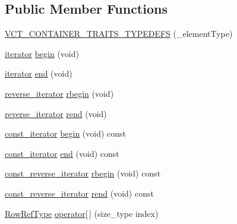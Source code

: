 \subsection*{Public Member Functions}
\begin{DoxyCompactItemize}
\item 
\hyperlink{classvct_dynamic_matrix_base_a9b74344e1642b42867b98720ed1ad438}{V\+C\+T\+\_\+\+C\+O\+N\+T\+A\+I\+N\+E\+R\+\_\+\+T\+R\+A\+I\+T\+S\+\_\+\+T\+Y\+P\+E\+D\+E\+F\+S} (\+\_\+element\+Type)
\item 
\hyperlink{classvct_dynamic_const_matrix_base_aee4b4524b7972fd1b324cba62505a949}{iterator} \hyperlink{classvct_dynamic_matrix_base_a8e125be29ccb28a13af84680926fee6f}{begin} (void)
\item 
\hyperlink{classvct_dynamic_const_matrix_base_aee4b4524b7972fd1b324cba62505a949}{iterator} \hyperlink{classvct_dynamic_matrix_base_ad99c7e972083d4a5377bc2516ce3426b}{end} (void)
\item 
\hyperlink{classvct_dynamic_const_matrix_base_a53905f35527b9ce433c246ab50a6b812}{reverse\+\_\+iterator} \hyperlink{classvct_dynamic_matrix_base_a61a464c0f702516f2f165227afd2c8b0}{rbegin} (void)
\item 
\hyperlink{classvct_dynamic_const_matrix_base_a53905f35527b9ce433c246ab50a6b812}{reverse\+\_\+iterator} \hyperlink{classvct_dynamic_matrix_base_a487009a6380b8016848b1f194f0b17bf}{rend} (void)
\item 
\hyperlink{classvct_dynamic_const_matrix_base_a665b16a8ecd8b6febb4d193efa42205e}{const\+\_\+iterator} \hyperlink{classvct_dynamic_matrix_base_a0e89cf694e8502ca5a1701a27dc4ec87}{begin} (void) const 
\item 
\hyperlink{classvct_dynamic_const_matrix_base_a665b16a8ecd8b6febb4d193efa42205e}{const\+\_\+iterator} \hyperlink{classvct_dynamic_matrix_base_a5c927de2694d1f35464fa02df53e5771}{end} (void) const 
\item 
\hyperlink{classvct_dynamic_const_matrix_base_afc30420e745eed5f1c838a01088ddc84}{const\+\_\+reverse\+\_\+iterator} \hyperlink{classvct_dynamic_matrix_base_a5c755e09c3fbe858a3b03381ccb8e3ac}{rbegin} (void) const 
\item 
\hyperlink{classvct_dynamic_const_matrix_base_afc30420e745eed5f1c838a01088ddc84}{const\+\_\+reverse\+\_\+iterator} \hyperlink{classvct_dynamic_matrix_base_a3870baf5cb2fc8c1af4b3c54cd0745bf}{rend} (void) const 
\item 
\hyperlink{classvct_dynamic_const_matrix_base_a15b845e745a76559d730ecef10a991b7}{Row\+Ref\+Type} \hyperlink{classvct_dynamic_matrix_base_a568fa0287c710ffbb872ba33d4f1fb3b}{operator\mbox{[}$\,$\mbox{]}} (size\+\_\+type index)

\end{DoxyCompactItemize}
